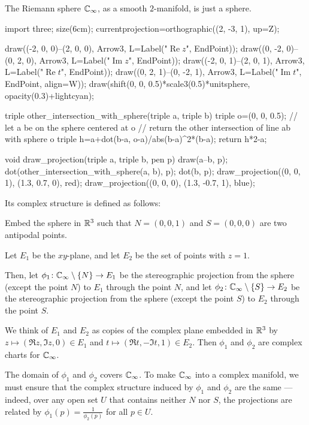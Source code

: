 \begin{example}
	\label{ex:riemann_sphere}
	The Riemann sphere $\mathbb C_\infty$, as a smooth $2$-manifold, is just a sphere.
	\begin{center}
		\begin{asy}
			import three;
			size(6cm);
			currentprojection=orthographic((2, -3, 1), up=Z);

			draw((-2, 0, 0)--(2, 0, 0), Arrow3, L=Label("$\operatorname{Re} z$", EndPoint));
			draw((0, -2, 0)--(0, 2, 0), Arrow3, L=Label("$\operatorname{Im} z$", EndPoint));
			draw((-2, 0, 1)--(2, 0, 1), Arrow3, L=Label("$\operatorname{Re} t$", EndPoint));
			draw((0, 2, 1)--(0, -2, 1), Arrow3, L=Label("$\operatorname{Im} t$", EndPoint, align=W));
			draw(shift(0, 0, 0.5)*scale3(0.5)*unitsphere, opacity(0.3)+lightcyan);

			triple other_intersection_with_sphere(triple a, triple b){
				triple o=(0, 0, 0.5);
				// let a be on the sphere centered at o
				// return the other intersection of line ab with sphere o
				triple h=a+dot(b-a, o-a)/abs(b-a)^2*(b-a);
				return h*2-a;
			}

			void draw_projection(triple a, triple b, pen p){
				draw(a--b, p);
				dot(other_intersection_with_sphere(a, b), p);
				dot(b, p);
			}
			draw_projection((0, 0, 1), (1.3, 0.7, 0), red);
			draw_projection((0, 0, 0), (1.3, -0.7, 1), blue);
		\end{asy}
	\end{center}
	Its complex structure is defined as follows:

	Embed the sphere in $\mathbb R^3$ such that $N = (0, 0, 1)$ and $S = (0, 0, 0)$ are two antipodal
	points.

	Let $E_1$ be the $xy$-plane, and let $E_2$ be the set of points with $z = 1$.

	Then, let $\phi_1 \colon \mathbb C_\infty \setminus \{ N \} \to E_1$ be the stereographic projection
	from the sphere (except the point $N$) to $E_1$ through the point $N$,
	and let $\phi_2 \colon \mathbb C_\infty \setminus \{ S \} \to E_2$ be the stereographic projection
	from the sphere (except the point $S$) to $E_2$ through the point $S$.

	We think of $E_1$ and $E_2$ as copies of the complex plane embedded in $\mathbb R^3$ by $z \mapsto
	(\Re z, \Im z, 0) \in E_1$ and $t \mapsto (\Re t, -\Im t, 1) \in E_2$.
	Then $\phi_1$ and $\phi_2$ are complex charts for $\mathbb C_\infty$.

	The domain of $\phi_1$ and $\phi_2$ covers $\mathbb C_\infty$.
	To make $\mathbb C_\infty$ into a complex manifold, we must ensure that the complex structure induced
	by $\phi_1$ and $\phi_2$ are the same --- indeed, over any open set $U$ that contains neither
	$N$ nor $S$, the projections are related by $\phi_1(p) = \frac{1}{\phi_2(p)}$ for all $p \in U$.


\end{example}
